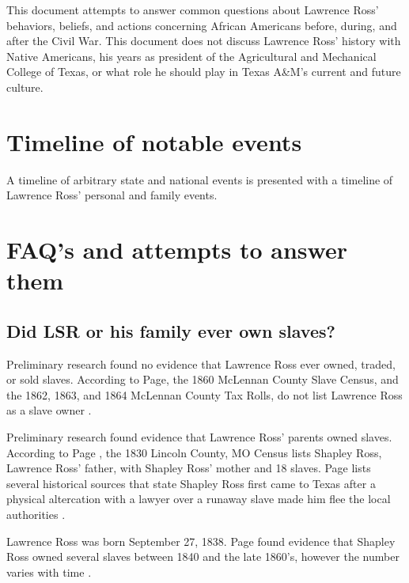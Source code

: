 \documentclass[12pt]{article}
\begin{document}
This document attempts to answer common questions about Lawrence Ross' behaviors, beliefs, and actions concerning African Americans before, during, and after the Civil War. This document does not discuss Lawrence Ross' history with Native Americans, his years as president of the Agricultural and Mechanical College of Texas, or what role he should play in Texas A\&M's current and future culture. 

\newpage
\section{Timeline of notable events}
A timeline of arbitrary state and national events is presented with a timeline of Lawrence Ross' personal and family events. 



\newpage
\section{FAQ's and attempts to answer them}

\subsection{Did LSR or his family ever own slaves? }
Preliminary research found no evidence that Lawrence Ross ever owned, traded, or sold slaves. According to Page, the 1860 McLennan County Slave Census, and the 1862, 1863, and 1864 McLennan County Tax Rolls, do not list Lawrence Ross as a slave owner \cite[pg.49]{page}.

Preliminary research found evidence that Lawrence Ross' parents owned slaves. According to Page \cite[pg.49]{page}, the 1830 Lincoln County, MO Census lists Shapley Ross, Lawrence Ross' father, with Shapley Ross' mother and 18 slaves. Page lists several historical sources that state Shapley Ross first came to Texas after a physical altercation with a lawyer over a runaway slave made him flee the local authorities \cite[pg.50--51]{page}. 

Lawrence Ross was born September 27, 1838. Page found evidence that Shapley Ross owned several slaves between 1840 and the late 1860's, however the number varies with time \cite[pg.51--55]{page}. 
\end{document}
